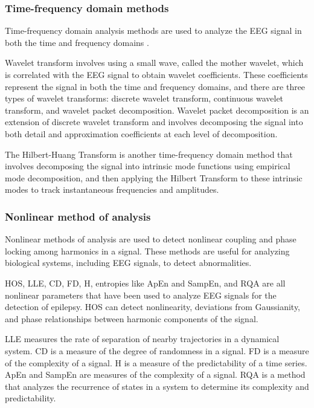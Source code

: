 \subsubsection{Time-frequency domain methods}
Time-frequency domain analysis methods are used to analyze the \gls{EEG} signal in both the time and frequency domains \cite{acharya_automated_2013}.

Wavelet transform involves using a small wave, called the mother wavelet, which is correlated with the \gls{EEG} signal to obtain wavelet coefficients. These coefficients represent the signal in both the time and frequency domains, and there are three types of wavelet transforms: discrete wavelet transform, continuous wavelet transform, and wavelet packet decomposition. 
Wavelet packet decomposition is an extension of discrete wavelet transform and involves decomposing the signal into both detail and approximation coefficients at each level of decomposition. 

The Hilbert-Huang Transform is another time-frequency domain method that involves decomposing the signal into intrinsic mode functions using empirical mode decomposition, and then applying the Hilbert Transform to these intrinsic modes to track instantaneous frequencies and amplitudes.

\subsubsection{Nonlinear method of analysis}
Nonlinear methods of analysis are used to detect nonlinear coupling and phase locking among harmonics in a signal. 
These methods are useful for analyzing biological systems, including EEG signals, to detect abnormalities. 

\gls{HOS}, \gls{LLE}, \gls{CD}, \gls{FD}, \gls{H}, entropies like \gls{ApEn} and \gls{SampEn}, and \gls{RQA} are all nonlinear parameters that have been used to analyze EEG signals for the detection of epilepsy. \gls{HOS} can detect nonlinearity, deviations from Gaussianity, and phase relationships between harmonic components of the signal. 

\gls{LLE} measures the rate of separation of nearby trajectories in a dynamical system. \gls{CD} is a measure of the degree of randomness in a signal. \gls{FD} is a measure of the complexity of a signal. \gls{H} is a measure of the predictability of a time series. \gls{ApEn} and \gls{SampEn} are measures of the complexity of a signal. \gls{RQA} is a method that analyzes the recurrence of states in a system to determine its complexity and predictability.

